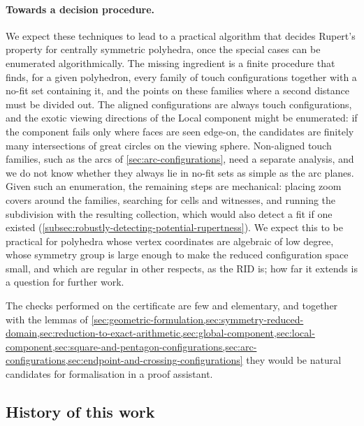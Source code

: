 \paragraph{Towards a decision procedure.}
We expect these techniques to lead to a practical algorithm that decides
Rupert's property for centrally symmetric polyhedra, once the special cases
can be enumerated algorithmically. The missing ingredient is a finite
procedure that finds, for a given polyhedron, every family of touch
configurations together with a no-fit set containing it, and the points on
these families where a second distance must be divided out. The aligned
configurations are always touch configurations, and the exotic viewing
directions of the Local component might be enumerated: if the component
fails only where faces are seen edge-on, the candidates are finitely many
intersections of great circles on the viewing sphere. Non-aligned touch
families, such as the arcs of \cref{sec:arc-configurations}, need a separate
analysis, and we do not know whether they always lie in no-fit sets as
simple as the arc planes. Given such an enumeration, the remaining steps
are mechanical: placing zoom covers around the families, searching for cells
and witnesses, and running the subdivision with the resulting collection,
which would also detect a fit if one existed
(\cref{subsec:robustly-detecting-potential-rupertness}). We expect this to
be practical for polyhedra whose vertex coordinates are algebraic of low
degree, whose symmetry group is large enough to make the reduced
configuration space small, and which are regular in other respects, as the
RID is; how far it extends is a question for further work.

The checks performed on the certificate are few and elementary, and
together with the lemmas of
\cref{sec:geometric-formulation,sec:symmetry-reduced-domain,sec:reduction-to-exact-arithmetic,sec:global-component,sec:local-component,sec:square-and-pentagon-configurations,sec:arc-configurations,sec:endpoint-and-crossing-configurations}
they would be natural candidates for formalisation in a proof assistant.

\subsection{History of this work}\label{subsec:history-of-this-work}

